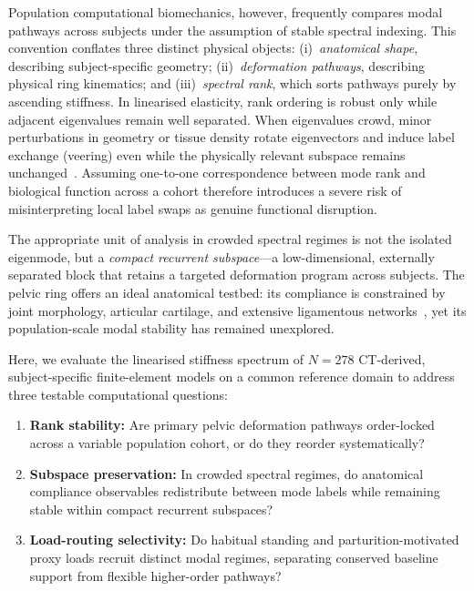 \documentclass[11pt]{article}
\begin{document}
Population computational biomechanics, however, frequently compares modal pathways across subjects under the assumption of stable spectral indexing.
This convention conflates three distinct physical objects:
(i)~\emph{anatomical shape}, describing subject-specific geometry;
(ii)~\emph{deformation pathways}, describing physical ring kinematics; and
(iii)~\emph{spectral rank}, which sorts pathways purely by ascending stiffness.
In linearised elasticity, rank ordering is robust only while adjacent eigenvalues remain well separated.
When eigenvalues crowd, minor perturbations in geometry or tissue density rotate eigenvectors and induce label exchange (veering) even while the physically relevant subspace remains unchanged~\citep{Pierre1988,ManconiMace2017,GhoshGhanem2012}.
Assuming one-to-one correspondence between mode rank and biological function across a cohort therefore introduces a severe risk of misinterpreting local label swaps as genuine functional disruption.

The appropriate unit of analysis in crowded spectral regimes is not the isolated eigenmode, but a \emph{compact recurrent subspace}---a low-dimensional, externally separated block that retains a targeted deformation program across subjects.
The pelvic ring offers an ideal anatomical testbed: its compliance is constrained by joint morphology, articular cartilage, and extensive ligamentous networks~\citep{Snijders1993,Vleeming2012,Goode2008}, yet its population-scale modal stability has remained unexplored.

Here, we evaluate the linearised stiffness spectrum of $N{=}278$ CT-derived, subject-specific finite-element models on a common reference domain to address three testable computational questions:
\begin{enumerate}[label=(\roman*)]
  \item \textbf{Rank stability:} Are primary pelvic deformation pathways order-locked across a variable population cohort, or do they reorder systematically?
  \item \textbf{Subspace preservation:} In crowded spectral regimes, do anatomical compliance observables redistribute between mode labels while remaining stable within compact recurrent subspaces?
  \item \textbf{Load-routing selectivity:} Do habitual standing and parturition-motivated proxy loads recruit distinct modal regimes, separating conserved baseline support from flexible higher-order pathways?
\end{enumerate}
\end{document}
